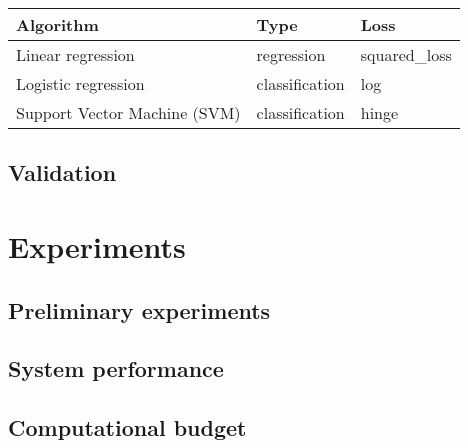 \begin{table}[h]
    \label{table:algorithms}
    \centering
    \begin{tabular}{lll}
        \toprule
        Algorithm                    & Type           & Loss          \\
        \midrule
        Linear regression            & regression     & squared\_loss \\
        Logistic regression          & classification & log           \\
        Support Vector Machine (SVM) & classification & hinge         \\
        \bottomrule
    \end{tabular}
\end{table}



\subsection{Validation}


\section{Experiments}
\label{sec:experiments}

\subsection{Preliminary experiments}
\subsection{System performance}
\subsection{Computational budget}

